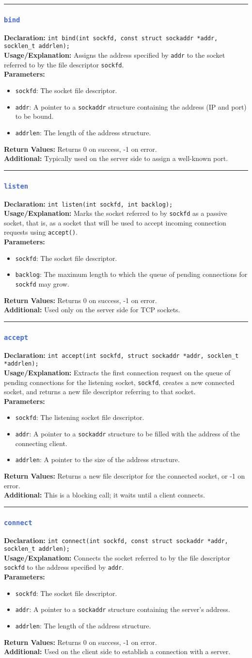 \documentclass[openany,12pt]{book}
\newcommand{\code}[1]{\texttt{#1}}
\newcommand{\blue}[1]{\textcolor{RoyalBlue}{#1}}
\newcommand{\functionEntryPar}[6]{%
  \noindent\rule{\linewidth}{0.5pt}
  \subsubsection*{\blue{\large{\texttt{#1}}}}
  \textbf{Declaration:} \texttt{#2} \\
  \textbf{Usage/Explanation:} #3 \\
  \textbf{Parameters:}
  \begin{itemize}[leftmargin=*]
    #4
  \end{itemize}
  \textbf{Return Values:} #5 \\
  \textbf{Additional:} #6
  \vspace{1em}
}
\begin{document}
\functionEntryPar{bind}
{int bind(int sockfd, const struct sockaddr *addr, socklen\_t addrlen);}
{Assigns the address specified by \code{addr} to the socket referred to by the file descriptor \code{sockfd}.}
{\item \code{sockfd}: The socket file descriptor.
 \item \code{addr}: A pointer to a \code{sockaddr} structure containing the address (IP and port) to be bound.
 \item \code{addrlen}: The length of the address structure.}
{Returns 0 on success, -1 on error.}
{Typically used on the server side to assign a well-known port.\label{func:bind}}

\functionEntryPar{listen}
{int listen(int sockfd, int backlog);}
{Marks the socket referred to by \code{sockfd} as a passive socket, that is, as a socket that will be used to accept incoming connection requests using \code{accept()}.}
{\item \code{sockfd}: The socket file descriptor.
 \item \code{backlog}: The maximum length to which the queue of pending connections for \code{sockfd} may grow.}
{Returns 0 on success, -1 on error.}
{Used only on the server side for TCP sockets.\label{func:listen}}

\functionEntryPar{accept}
{int accept(int sockfd, struct sockaddr *addr, socklen\_t *addrlen);}
{Extracts the first connection request on the queue of pending connections for the listening socket, \code{sockfd}, creates a new connected socket, and returns a new file descriptor referring to that socket.}
{\item \code{sockfd}: The listening socket file descriptor.
 \item \code{addr}: A pointer to a \code{sockaddr} structure to be filled with the address of the connecting client.
 \item \code{addrlen}: A pointer to the size of the address structure.}
{Returns a new file descriptor for the connected socket, or -1 on error.}
{This is a blocking call; it waits until a client connects.\label{func:accept}}

\functionEntryPar{connect}
{int connect(int sockfd, const struct sockaddr *addr, socklen\_t addrlen);}
{Connects the socket referred to by the file descriptor \code{sockfd} to the address specified by \code{addr}.}
{\item \code{sockfd}: The socket file descriptor.
 \item \code{addr}: A pointer to a \code{sockaddr} structure containing the server's address.
 \item \code{addrlen}: The length of the address structure.}
{Returns 0 on success, -1 on error.}
{Used on the client side to establish a connection with a server.\label{func:connect}}
\end{document}
